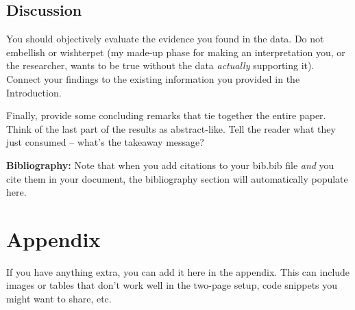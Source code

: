 \documentclass{article}\usepackage[]{graphicx}\usepackage[]{xcolor}
\begin{document}
\begin{multicols}{2}
\section{Discussion}
 You should objectively evaluate the evidence you found in the data. Do not embellish or wishterpet (my made-up phase for making an interpretation you, or the researcher, wants to be true without the data \emph{actually} supporting it). Connect your findings to the existing information you provided in the Introduction.

Finally, provide some concluding remarks that tie together the entire paper. Think of the last part of the results as abstract-like. Tell the reader what they just consumed -- what's the takeaway message?

\vspace{2em}

\noindent\textbf{Bibliography:} Note that when you add citations to your bib.bib file \emph{and}
you cite them in your document, the bibliography section will automatically populate here.

\begin{tiny}

\end{tiny}
\end{multicols}

\newpage
\onecolumn
\section{Appendix}

If you have anything extra, you can add it here in the appendix. This can include images or tables that don't work well in the two-page setup, code snippets you might want to share, etc.
\end{document}
